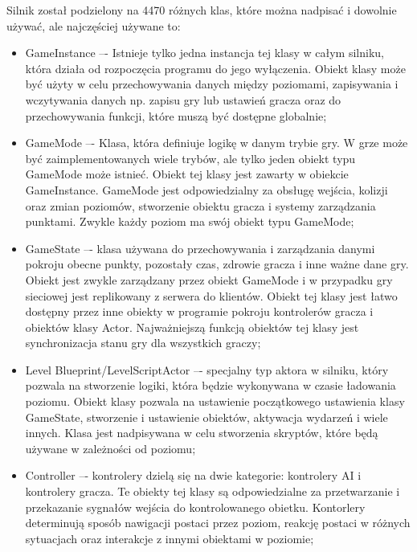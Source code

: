 \documentclass[12pt,twoside]{article}
\begin{document}
Silnik został podzielony na 4470 różnych klas, które można nadpisać i dowolnie
używać, ale najczęściej używane to:
\begin{itemize}
\item GameInstance –- Istnieje tylko jedna instancja tej klasy w całym silniku,
która działa od rozpoczęcia programu do jego wyłączenia. Obiekt klasy może być
użyty w celu przechowywania danych między poziomami, zapisywania i wczytywania
danych np. zapisu gry lub ustawień gracza oraz do przechowywania funkcji, które
muszą być dostępne globalnie\cite{UE:GameInstance}; 

\item GameMode –- Klasa, która definiuje logikę w danym trybie gry. W grze może
być zaimplementowanych wiele trybów, ale tylko jeden obiekt typu GameMode może
istnieć. Obiekt tej klasy jest zawarty w obiekcie GameInstance. GameMode jest
odpowiedzialny za obsługę wejścia, kolizji oraz zmian poziomów, stworzenie
obiektu gracza i systemy zarządzania punktami. Zwykle każdy poziom ma swój
obiekt typu GameMode\cite{UE:GameModeState};

\item GameState –- klasa używana do przechowywania i zarządzania danymi pokroju
obecne punkty, pozostały czas, zdrowie gracza i inne ważne dane gry. Obiekt jest
zwykle zarządzany przez obiekt GameMode i w przypadku gry sieciowej jest
replikowany z serwera do klientów. Obiekt tej klasy jest łatwo dostępny przez
inne obiekty w programie pokroju kontrolerów gracza i obiektów klasy Actor.
Najważniejszą funkcją obiektów tej klasy jest synchronizacja stanu gry dla
wszystkich graczy\cite{UE:GameModeState};

\item Level Blueprint/LevelScriptActor –- specjalny typ aktora w silniku, który
pozwala na stworzenie logiki, która będzie wykonywana w czasie ładowania
poziomu. Obiekt klasy pozwala na ustawienie początkowego ustawienia klasy
GameState, stworzenie i ustawienie obiektów, aktywacja wydarzeń i wiele innych.
Klasa jest nadpisywana w celu stworzenia skryptów, które będą używane w
zależności od poziomu\cite{UE:LevelScriptActor};

\item Controller –- kontrolery dzielą się na dwie kategorie: kontrolery AI i
kontrolery gracza. Te obiekty tej klasy są odpowiedzialne za przetwarzanie i
przekazanie sygnałów wejścia do kontrolowanego obietku. Kontorlery determinują
sposób nawigacji postaci przez poziom, reakcję postaci w różnych sytuacjach oraz
interakcje z innymi obiektami w poziomie\cite{UE:Controller};



\end{itemize}
\end{document}
